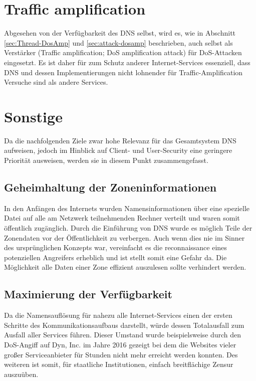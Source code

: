 \section{Traffic amplification}
\label{sec:goals-trafficamp}
Abgesehen von der Verfügbarkeit des DNS selbst, wird es, wie in Abschnitt \ref{sec:Thread-DosAmp} und \ref{sec:attack-dosamp} beschrieben, auch selbst als Verstärker (Traffic amplification; DoS amplification attack) für DoS-Attacken eingesetzt. Es ist daher für zum Schutz anderer Internet-Services essenziell, dass DNS und dessen Implementierungen nicht lohnender für Traffic-Amplification Versuche sind als andere Services. 

\section{Sonstige}

Da die nachfolgenden Ziele zwar hohe Relevanz für das Gesamtsystem DNS aufweisen, jedoch im Hinblick auf Client- und User-Security eine geringere Priorität ausweisen, werden sie in diesem Punkt zusammengefasst.

\subsection{Geheimhaltung der Zoneninformationen}
In den Anfängen des Internets wurden Namensinformationen über eine spezielle Datei auf alle am Netzwerk teilnehmenden Rechner verteilt \cite{rfc1035} und waren somit öffentlich zugänglich. Durch die Einführung von DNS wurde es möglich Teile der Zonendaten vor der Öffentlichkeit zu verbergen. Auch wenn dies nie im Sinner des ursprünglichen Konzepts war, vereinfacht es die reconnaissance eines potenziellen Angreifers erheblich und ist stellt somit eine Gefahr da. Die Möglichkeit alle Daten einer Zone effizient auszulesen sollte verhindert werden.

\subsection{Maximierung der Verfügbarkeit}
Da die Namensauflösung für nahezu alle Internet-Services einen der ersten Schritte des Kommunikationsaufbaus darstellt, würde dessen Totalausfall zum Ausfall aller Services führen. Dieser Umstand wurde beispielsweise durch den DoS-Angiff auf Dyn, Inc. im Jahre 2016 gezeigt \cite{Newman2016} bei dem die Websites vieler großer Serviceanbieter für Stunden nicht mehr erreicht werden konnten. Des weiteren ist somit, für staatliche Institutionen, einfach breitflächige Zensur auszuüben\cite{turkybbc2017}\cite{turkywp2018}. 

